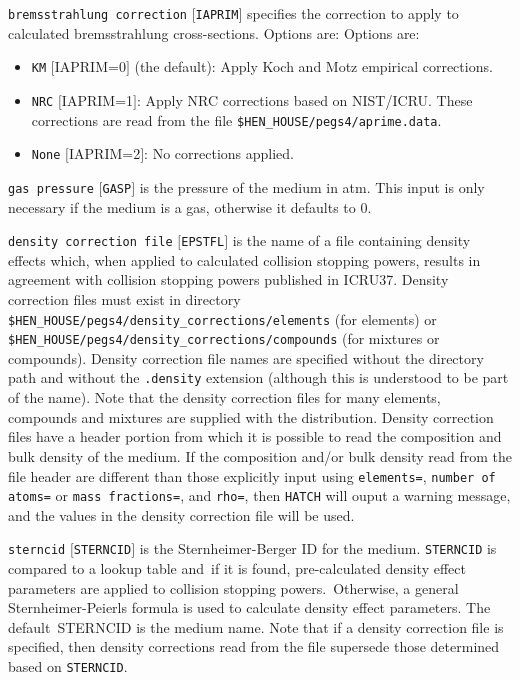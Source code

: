 \documentclass[12pt,twoside]{article}  %
\begin{document}
\begin{description}
\begin{description}
\begin{itemize}
\end{itemize}
\item {\tt bremsstrahlung correction} $[${\tt IAPRIM}$]$ specifies the correction to apply to calculated bremsstrahlung cross-sections.
Options are:
Options are:
\begin{itemize}
\item {\tt KM} $[$IAPRIM=0$]$ (the default): Apply Koch and Motz\cite{KM59} empirical corrections.
\item {\tt NRC} $[$IAPRIM=1$]$: Apply NRC corrections based on NIST/ICRU\cite{Ro89a}.  These corrections are read from the file
{\tt \$HEN\_HOUSE/pegs4/aprime.data}.
\item {\tt None} $[$IAPRIM=2$]$: No corrections applied.
\end{itemize}
\item {\tt gas pressure} $[${\tt GASP}$]$ is the pressure of the medium in atm.  This input is only necessary if the medium is a gas, otherwise it
defaults to 0.
\item {\tt density correction file} $[${\tt EPSTFL}$]$ is the name of a file containing density effects which, when applied to calculated collision
stopping powers, results in agreement with collision stopping powers published in ICRU37\cite{ICRU37}.  Density correction files must exist
in directory {\tt \$HEN\_HOUSE/pegs4/density\_corrections/elements} (for elements) or {\tt \$HEN\_HOUSE/pegs4/density\_corrections/compounds} (for mixtures or compounds).  Density correction file names are specified without the directory path and without the {\tt .density}
extension (although this is understood to be part of the name).  Note that the density correction files for many elements, compounds
and mixtures are supplied with
the distribution.  Density correction files have a header portion from which it is possible to read the composition and bulk
density of the medium.  If the composition and/or bulk density read from the file header are different than those explicitly input
using {\tt elements=}, {\tt number of atoms=} or {\tt mass fractions=}, and {\tt rho=}, then {\tt HATCH} will ouput a warning
message, and the values in the density correction file will be used.
\item {\tt sterncid} $[${\tt STERNCID}$]$  is the Sternheimer-Berger ID for the medium. {\tt STERNCID} is compared to a lookup table and\
if it is found, pre-calculated density effect parameters are applied to collision stopping powers.\
Otherwise, a general Sternheimer-Peierls formula is used to calculate density effect parameters.  The default\
STERNCID is the medium name.  Note that if a density correction file is specified, then density corrections read from the file
supersede those determined based on {\tt STERNCID}.
\end{description}
\end{description}
\end{document}
